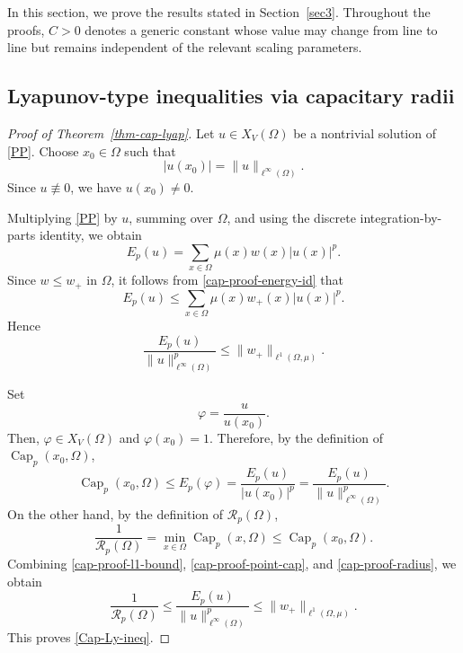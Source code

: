 \documentclass[twoside,12pt,letter]{article}
\theoremstyle{plain}
\theoremstyle{definition}
\theoremstyle{remark}
\numberwithin{equation}{section}
\begin{document}
In this section, we prove the results stated in Section~\ref{sec3}.
Throughout the proofs, \(C>0\) denotes a generic constant whose value may
change from line to line but remains independent of the relevant scaling
parameters.

\subsection{Lyapunov-type inequalities via capacitary radii}

\begin{proof}[Proof of Theorem~\ref{thm-cap-lyap}]
Let \(u\in X_V(\Omega)\) be a nontrivial solution of \eqref{PP}. Choose
\(x_0\in\Omega\) such that
\[
|u(x_0)|=\|u\|_{\ell^\infty(\Omega)}.
\]
Since \(u\not\equiv 0\), we have \(u(x_0)\neq 0\).

Multiplying \eqref{PP} by \(u\), summing over \(\Omega\), and using the
discrete integration-by-parts identity, we obtain
\begin{equation}\label{cap-proof-energy-id}
E_p(u)=\sum_{x\in\Omega}\mu(x)w(x)|u(x)|^p.
\end{equation}
Since \(w\le w_+\) in \(\Omega\), it follows from
\eqref{cap-proof-energy-id} that
\begin{equation}\label{nsit}
E_p(u)
\le
\sum_{x\in\Omega}\mu(x)w_+(x)|u(x)|^p.
\end{equation}
Hence
\begin{equation}\label{cap-proof-l1-bound}
\frac{E_p(u)}{\|u\|_{\ell^\infty(\Omega)}^p}
\le
\|w_+\|_{\ell^1(\Omega,\mu)}.
\end{equation}

Set
\[
\varphi=\frac{u}{u(x_0)}.
\]
Then, \(\varphi\in X_V(\Omega)\) and \(\varphi(x_0)=1\). Therefore, by the
definition of \(\operatorname{Cap}_p(x_0,\Omega)\),
\begin{equation}\label{cap-proof-point-cap}
\operatorname{Cap}_p(x_0,\Omega)
\le
E_p(\varphi)
=
\frac{E_p(u)}{|u(x_0)|^p}
=
\frac{E_p(u)}{\|u\|_{\ell^\infty(\Omega)}^p}.
\end{equation}
On the other hand, by the definition of \(\mathcal{R}_p(\Omega)\),
\begin{equation}\label{cap-proof-radius}
\frac{1}{\mathcal{R}_p(\Omega)}
=
\min_{x\in\Omega}\operatorname{Cap}_p(x,\Omega)
\le
\operatorname{Cap}_p(x_0,\Omega).
\end{equation}
Combining \eqref{cap-proof-l1-bound}, \eqref{cap-proof-point-cap}, and
\eqref{cap-proof-radius}, we obtain
\[
\frac{1}{\mathcal{R}_p(\Omega)}
\le
\frac{E_p(u)}{\|u\|_{\ell^\infty(\Omega)}^p}
\le
\|w_+\|_{\ell^1(\Omega,\mu)}.
\]
This proves \eqref{Cap-Ly-ineq}.


\end{proof}
\end{document}
